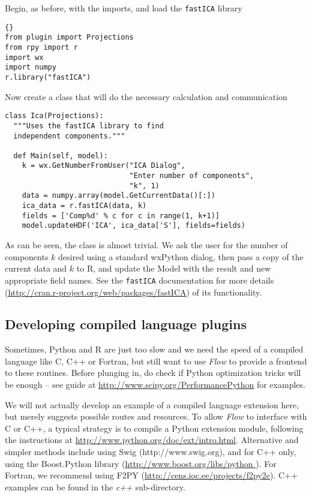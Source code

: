 \documentclass{article}
\begin{document}
Begin, as before, with the imports, and load the \texttt{fastICA}
library

\begin{lstlisting}[]{}
from plugin import Projections
from rpy import r
import wx
import numpy
r.library("fastICA")
\end{lstlisting}

Now create a class that will do the necessary calculation and
communication

\begin{lstlisting}
class Ica(Projections):
  """Uses the fastICA library to find 
  independent components."""

  def Main(self, model):
    k = wx.GetNumberFromUser("ICA Dialog",
                             "Enter number of components",
                             "k", 1)
    data = numpy.array(model.GetCurrentData()[:])
    ica_data = r.fastICA(data, k)
    fields = ['Comp%d' % c for c in range(1, k+1)]
    model.updateHDF('ICA', ica_data['S'], fields=fields)
\end{lstlisting}

As can be seen, the class is almost trivial. We ask the user for the
number of components $k$ desired using a standard wxPython dialog,
then pass a copy of the current data and $k$ to R, and update the
Model with the result and new appropriate field names. See the
\texttt{fastICA} documentation for more details
(\url{http://cran.r-project.org/web/packages/fastICA}) of its
functionality.

\subsection*{Developing compiled language plugins}

Sometimes, Python and R are just too slow and we need the speed of a
compiled language like C, C++ or Fortran, but still want to use
\emph{Flow} to provide a frontend to these routines. Before plunging
in, do check if Python optimization tricks will be enough -- see guide
at \url{http://www.scipy.org/PerformancePython} for examples. 

We will not actually develop an example of a compiled language
extension here, but merely suggests possible routes and resources. To
allow \emph{Flow} to interface with C or C++, a typical strategy is to
compile a Python extension module, following the instructions at
\url{http://www.python.org/doc/ext/intro.html}. Alternative and
simpler methods include using Swig (http://www.swig.org), and for C++
only, using the Boost.Python library
(\url{http://www.boost.org/libs/python }). For Fortran, we recommend
using F2PY (\url{http://cens.ioc.ee/projects/f2py2e}). C++ examples
can be found in the \emph{c++} sub-directory.
\end{document}
